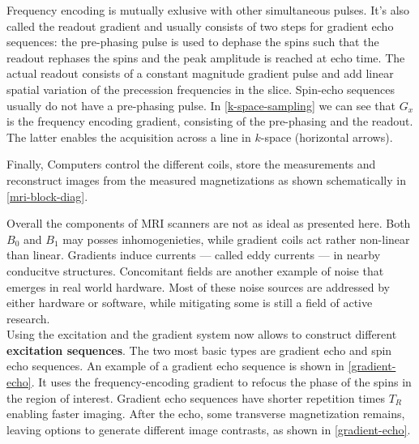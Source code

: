 Frequency encoding is mutually exlusive with other simultaneous pulses.
It's also called the readout gradient and usually consists of two steps for gradient echo sequences: the pre-phasing pulse is used to dephase the spins such that the readout rephases the spins and the peak amplitude is reached at echo time.
The actual readout consists of a constant magnitude gradient pulse and add linear spatial variation of the precession frequencies in the slice.
Spin-echo sequences usually do not have a pre-phasing pulse.
In \ref{k-space-sampling} we can see that $G_x$ is the frequency encoding gradient, consisting of the pre-phasing and the readout.
The latter enables the acquisition across a line in $k$-space (horizontal arrows).



Finally, Computers control the different coils, store the measurements and reconstruct images from the measured magnetizations as shown schematically in \ref{mri-block-diag}. \\

Overall the components of MRI scanners are not as ideal as presented here.
Both $B_0$ and $B_1$ may posses inhomogenieties, while gradient coils act rather non-linear than linear.
Gradients induce currents --- called eddy currents --- in nearby conducitve structures.
Concomitant fields are another example of noise that emerges in real world hardware.
Most of these noise sources are addressed by either hardware or software, while mitigating some is still a field of active research. \\

Using the excitation and the gradient system now allows to construct different \textbf{excitation sequences}.
The two most basic types are gradient echo and spin echo sequences.
An example of a gradient echo sequence is shown in \ref{gradient-echo}.
It uses the frequency-encoding gradient to refocus the phase of the spins in the region of interest.
Gradient echo sequences have shorter repetition times $T_R$ enabling faster imaging.
After the echo, some transverse magnetization remains, leaving options to generate different image contrasts, as shown in \ref{gradient-echo}.

